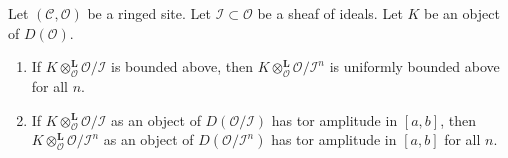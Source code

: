 \begin{lemma}
\label{lemma-bounded}
Let $(\mathcal{C}, \mathcal{O})$ be a ringed site.
Let $\mathcal{I} \subset \mathcal{O}$ be a sheaf of ideals.
Let $K$ be an object of $D(\mathcal{O})$.
\begin{enumerate}
\item If $K \otimes_\mathcal{O}^\mathbf{L} \mathcal{O}/\mathcal{I}$
is bounded above, then
$K \otimes_\mathcal{O}^\mathbf{L} \mathcal{O}/\mathcal{I}^n$
is uniformly bounded above for all $n$.
\item If $K \otimes_\mathcal{O}^\mathbf{L} \mathcal{O}/\mathcal{I}$
as an object of $D(\mathcal{O}/\mathcal{I})$ has tor amplitude in $[a, b]$,
then $K \otimes_\mathcal{O}^\mathbf{L} \mathcal{O}/\mathcal{I}^n$
as an object of $D(\mathcal{O}/\mathcal{I}^n)$
has tor amplitude in $[a, b]$ for all $n$.
\end{enumerate}
\end{lemma}

